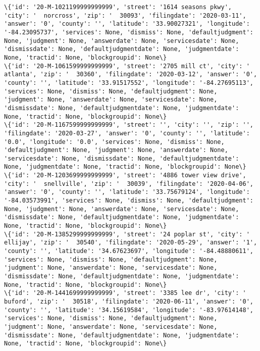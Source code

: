 \documentclass[11pt]{article}
\begin{document}
\begin{Verbatim}[commandchars=\\\{\}]
\{'id': '20-M-1021199999999999', 'street': '1614 seasons pkwy', 'city': '  norcross', 'zip': '  30093', 'filingdate': '2020-03-11', 'answer': '0', 'county': '', 'latitude': '33.90027321', 'longitude': '-84.23095737', 'services': None, 'dismiss': None, 'defaultjudgment': None, 'judgment': None, 'answerdate': None, 'servicesdate': None, 'dismissdate': None, 'defaultjudgmentdate': None, 'judgmentdate': None, 'tractid': None, 'blockgroupid': None\}
\{'id': '20-M-1061599999999999', 'street': '2705 mill ct', 'city': '  atlanta', 'zip': '  30360', 'filingdate': '2020-03-12', 'answer': '0', 'county': '', 'latitude': '33.91517552', 'longitude': '-84.27695113', 'services': None, 'dismiss': None, 'defaultjudgment': None, 'judgment': None, 'answerdate': None, 'servicesdate': None, 'dismissdate': None, 'defaultjudgmentdate': None, 'judgmentdate': None, 'tractid': None, 'blockgroupid': None\}
\{'id': '20-M-1167599999999999', 'street': '', 'city': '', 'zip': '', 'filingdate': '2020-03-27', 'answer': '0', 'county': '', 'latitude': '0.0', 'longitude': '0.0', 'services': None, 'dismiss': None, 'defaultjudgment': None, 'judgment': None, 'answerdate': None, 'servicesdate': None, 'dismissdate': None, 'defaultjudgmentdate': None, 'judgmentdate': None, 'tractid': None, 'blockgroupid': None\}
\{'id': '20-M-1203699999999999', 'street': '4886 tower view drive', 'city': '  snellville', 'zip': '  30039', 'filingdate': '2020-04-06', 'answer': '0', 'county': '', 'latitude': '33.75679124', 'longitude': '-84.03573991', 'services': None, 'dismiss': None, 'defaultjudgment': None, 'judgment': None, 'answerdate': None, 'servicesdate': None, 'dismissdate': None, 'defaultjudgmentdate': None, 'judgmentdate': None, 'tractid': None, 'blockgroupid': None\}
\{'id': '20-M-1385299999999999', 'street': '24 poplar st', 'city': '  ellijay', 'zip': '  30540', 'filingdate': '2020-05-29', 'answer': '1', 'county': '', 'latitude': '34.67623697', 'longitude': '-84.48880611', 'services': None, 'dismiss': None, 'defaultjudgment': None, 'judgment': None, 'answerdate': None, 'servicesdate': None, 'dismissdate': None, 'defaultjudgmentdate': None, 'judgmentdate': None, 'tractid': None, 'blockgroupid': None\}
\{'id': '20-M-1441699999999999', 'street': '3385 lee dr', 'city': '  buford', 'zip': '  30518', 'filingdate': '2020-06-11', 'answer': '0', 'county': '', 'latitude': '34.15619584', 'longitude': '-83.97614148', 'services': None, 'dismiss': None, 'defaultjudgment': None, 'judgment': None, 'answerdate': None, 'servicesdate': None, 'dismissdate': None, 'defaultjudgmentdate': None, 'judgmentdate': None, 'tractid': None, 'blockgroupid': None\}

\end{Verbatim}
\end{document}
